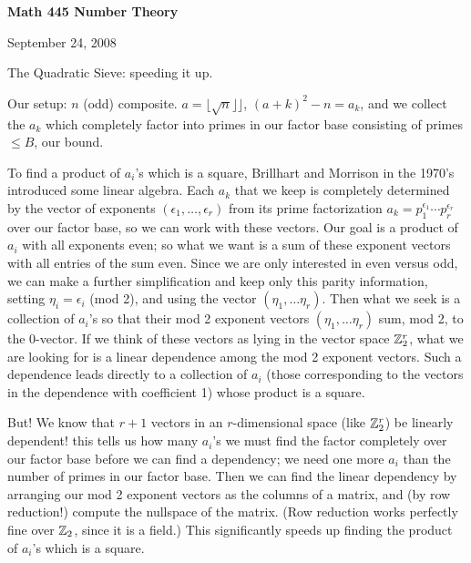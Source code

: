





\loadmsbm

\nopagenumbers
\overfullrule=0pt


\def\ctln{\centerline}
\def\u{\underbar}
\def\ssk{\smallskip}
\def\msk{\medskip}
\def\bsk{\bigskip}
\def\dl{\displaystyle}
\def\ni{\noindent}
\def\ep{\epsilon}


\ctln{\bf Math 445 Number Theory}

\medskip

\ctln{September 24, 2008}

\bigskip

The Quadratic Sieve: speeding it up.

\ssk

Our setup: $n$ (odd) composite. $a=\lfloor\sqrt{n}\rfloor\rfloor$, $(a+k)^2-n=a_k$, and we collect the $a_k$ which completely
factor into primes in our factor base consisting of primes $\leq B$, our bound.

\ssk

To find a product of $a_i$'s which is a square, Brillhart and Morrison in the 1970's introduced some
linear algebra.
Each $a_k$ that we keep is completely determined by the vector of exponents $(\ep_1,\ldots,\ep_r)$ from its prime
factorization $a_k=p_1^{\ep_1}\cdots p_r^{\ep_r}$ over our factor base, so we can work with these vectors.
Our goal is a product of $a_i$ with all exponents even; so what we want is a sum of these
exponent vectors with all entries of the sum even. Since we are only interested in even versus odd, we can make a further
simplification and keep only this parity information, setting $\eta_i=\ep_i$ (mod 2), and using the
vector $(\eta_1,\ldots \eta_r)$. Then what we seek is a collection of $a_i$'s so that their mod 2 exponent vectors
$(\eta_1,\ldots \eta_r)$ sum, mod 2, to the 0-vector. If we think of these vectors as lying in the vector space
${\Bbb Z}_2^r$, what we are looking for is a linear dependence among the mod 2 exponent vectors. Such a dependence
leads directly to a collection of $a_i$ (those corresponding to the vectors in the dependence with coefficient 1)
whose product is a square. 

\ssk

But! We know that $r+1$ vectors in an $r$-dimensional space (like ${\Bbb Z}_2^r$)  be linearly dependent!
this tells us how many $a_i$'s we must find the factor completely over our factor base before we can find a
dependency; we need one more $a_i$ than the number of primes in our factor base. Then we can find the
linear dependency by arranging our mod 2 exponent vectors as the columns of a matrix, and (by row reduction!)
compute the nullspace of the matrix. (Row reduction works perfectly fine over ${\Bbb Z}_2$, since it is a field.)
This significantly speeds up finding the product of $a_i$'s which is a square.

